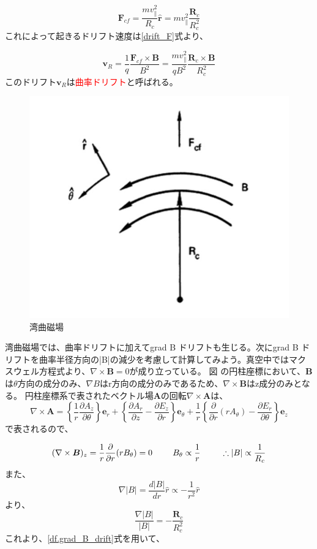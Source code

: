 \documentclass{ltjsarticle}
\numberwithin{equation}{section} %
\begin{document}
\begin{equation}
  \bm{F}_{cf} = \frac{mv_\parallel ^2}{R_c} \hat{\bm{r}} = mv_\parallel ^2 \frac{\bm{R}_c}{R_c ^2}
\end{equation}
これによって起きるドリフト速度は\eqref{drift_F}式より、

\begin{equation}
  \boxed{\bm{v}_R = \frac{1}{q}\frac{\bm{F}_{cf} \times \bm{B}}{B^2} = \frac{mv_\parallel ^2 }{qB^2} \frac{\bm{R}_c \times \bm{B}}{R_c ^2}}
\end{equation}
このドリフト$\bm{v}_R$は\textcolor{red}{曲率ドリフト}と呼ばれる。

\begin{figure}[htbp]
  \centering
  \includegraphics[width=0.7\linewidth]{curvature.png}
  \caption{湾曲磁場}
  \label{fig.curvature}
\end{figure}

湾曲磁場では、曲率ドリフトに加えてgrad B ドリフトも生じる。次にgrad B ドリフトを曲率半径方向の|B|の減少を考慮して計算してみよう。真空中ではマクスウェル方程式より、$\nabla \times \bm{B} = 0$が成り立っている。
図 の円柱座標において、$\bm{B}$は$\theta$方向の成分のみ、$\nabla B$はr方向の成分のみであるため、$\nabla \times \bm{B}$はz成分のみとなる。
円柱座標系で表されたベクトル場$\bm{A}$の回転$\nabla \times \bm{A}$は、
\[
 \nabla \times \bm{A} = \left\{\frac{1}{r}\frac{\partial A_z}{\partial \theta}\right\}\bm{e}_r + \left\{\frac{\partial A_r}{\partial z}-\frac{\partial E_z}{\partial r}\right\}\bm{e}_\theta + \dfrac{1}{r}\left\{\frac{\partial}{\partial r}(rA_\theta) - \frac{\partial E_r}{\partial \theta}\right\}\bm{e}_z
\]
で表されるので、

\begin{equation}
  (\nabla \times \bm{B})_z = \frac{1}{r}\frac{\partial}{\partial r} (rB_\theta) = 0 \hspace{2pc} B_\theta \propto \frac{1}{r} \hspace{2pc} \therefore |B| \propto \frac{1}{R_c}
\end{equation}
また、
\[
  \nabla |B| = \frac{d|B|}{dr}\hat{r} \propto -\frac{1}{r^2}\hat{r} 
\]
より、
\begin{equation}
  \frac{\nabla |B|}{|B|} = -\frac{\bm{R}_c}{R_c ^2}
\end{equation}
これより、\eqref{df.grad_B_drift}式を用いて、
\end{document}

